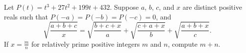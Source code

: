 Let $P(t) = t^3+27t^2+199t+432$.  Suppose $a$, $b$, $c$, and $x$ are distinct positive reals such that $P(-a)=P(-b)=P(-c)=0$, and \[
\sqrt{\frac{a+b+c}{x}} = \sqrt{\frac{b+c+x}{a}} + \sqrt{\frac{c+a+x}{b}} + \sqrt{\frac{a+b+x}{c}}. \] If $x=\frac{m}{n}$ for relatively prime positive integers $m$ and $n$, compute $m+n$.
